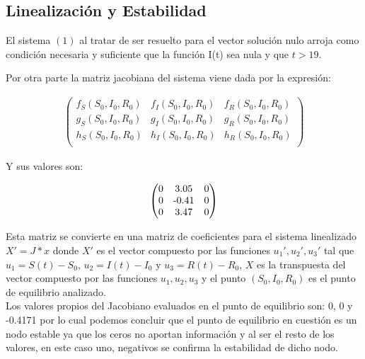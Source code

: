 \documentclass{wscpaperproc}
\theoremstyle{wsc}
\begin{document}
\subsection{Linealizaci\'on y Estabilidad}
El sistema $(1)$ al tratar de ser resuelto para el vector solución nulo arroja como condición necesaria y suficiente
que la función I(t) sea nula y que $t>19$.

Por otra parte la matriz jacobiana del sistema viene dada por la expresión:

\begin{equation}
\begin{aligned}
\begin{pmatrix}
f_S(S_0,I_0,R_0) & f_I(S_0,I_0,R_0) & f_R(S_0,I_0,R_0)\\
g_S(S_0,I_0,R_0) & g_I(S_0,I_0,R_0) & g_R(S_0,I_0,R_0)\\
h_S(S_0,I_0,R_0) & h_I(S_0,I_0,R_0) & h_R(S_0,I_0,R_0)\\
\end{pmatrix}
\end{aligned}
\end{equation}


Y sus valores son:

\begin{equation}
\begin{aligned}
\begin{pmatrix}
	$0$ & $3.05$ & $0$\\
	
	$0$ & $-0.41$ & $0$\\
	
	$0$ & $3.47$ & $0$\\
\end{pmatrix}
\end{aligned}
\end{equation}

Esta matriz se convierte en una matriz de coeficientes para el sistema linealizado
$X'=J*x$ donde $X'$ es el vector compuesto por las funciones $u_1', u_2', u_3'$ tal que 
$u_1 = S(t)- S_0$, $u_2 = I(t)-I_0$ y $u_3 = R(t)- R_0$, $X$ es la transpuesta del vector compuesto por 
las funciones $u_1, u_2, u_3$ y el punto $(S_0,I_0,R_0)$ es el punto de equilibrio analizado.\\

Los valores propios del Jacobiano evaluados en el punto de equilibrio son: 0, 0 y -0.4171
por lo cual podemos concluir que el punto de equilibrio en cuesti\'on es un nodo estable ya que
los ceros no aportan informaci\'on y al ser el resto de los valores, en este caso uno, negativos
se confirma la estabilidad de dicho nodo.
\end{document}
